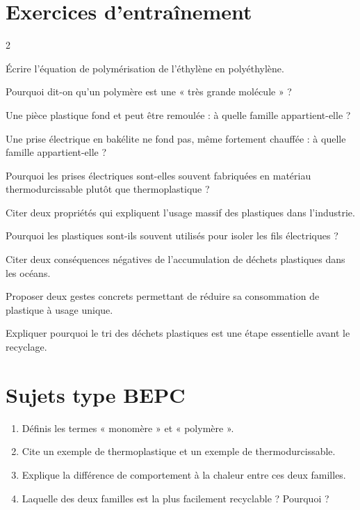 \section{Exercices d'entraînement}
\begin{multicols}{2}

\exo{} Écrire l'équation de polymérisation de l'éthylène en polyéthylène.

\exo{} Pourquoi dit-on qu'un polymère est une « très grande molécule » ?

\exo{} Une pièce plastique fond et peut être remoulée : à quelle famille
appartient-elle ?

\exo{} Une prise électrique en bakélite ne fond pas, même fortement chauffée : à
quelle famille appartient-elle ?

\exo{} Pourquoi les prises électriques sont-elles souvent fabriquées en
matériau thermodurcissable plutôt que thermoplastique ?

\exo{} Citer deux propriétés qui expliquent l'usage massif des plastiques dans
l'industrie.

\exo{} Pourquoi les plastiques sont-ils souvent utilisés pour isoler les fils
électriques ?

\exo{} Citer deux conséquences négatives de l'accumulation de déchets plastiques
dans les océans.

\exo{} Proposer deux gestes concrets permettant de réduire sa consommation de
plastique à usage unique.

\exo{} Expliquer pourquoi le tri des déchets plastiques est une étape essentielle
avant le recyclage.

\end{multicols}

\section{Sujets type BEPC}

\begin{enumerate}[label=\arabic*)]
\item Définis les termes « monomère » et « polymère ».
\item Cite un exemple de thermoplastique et un exemple de thermodurcissable.
\item Explique la différence de comportement à la chaleur entre ces deux familles.
\item Laquelle des deux familles est la plus facilement recyclable ? Pourquoi ?
\end{enumerate}

